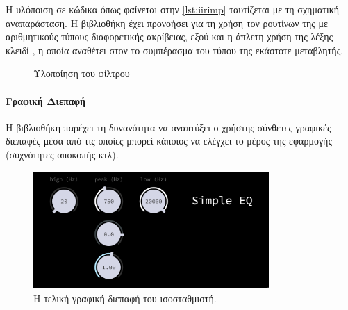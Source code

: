 \documentclass{article}
\begin{document}
Η υλόποιση σε κώδικα όπως φαίνεται στην \cref{lst:iirimp} ταυτίζεται με τη σχηματική 
αναπαράσταση. Η βιβλιοθήκη  έχει προνοήσει για τη χρήση τον ρουτίνων 
της με αριθμητικούς τύπους διαφορετικής ακρίβειας, εξού και η άπλετη χρήση της 
λέξης-κλειδί  \cite{CppReferenceAuto}, η οποία αναθέτει στον  το συμπέρασμα του τύπου 
της εκάστοτε μεταβλητής.

\vspace{5mm}

\begin{figure}
\centering
    
\caption{Υλοποίηση του  φίλτρου}
\label{fig:iir_filter_block}

\end{figure}

\begin{minipage}{\textwidth}
\end{minipage}


\paragraph{Γραφική Διεπαφή}

\epigraph{}{}

Η βιβλιοθήκη  παρέχει τη δυνανότητα να αναπτύξει ο χρήστης 
σύνθετες γραφικές διεπαφές μέσα από τις οποίες μπορεί κάποιος να ελέγχει 
το  μέρος της εφαρμογής (συχνότητες αποκοπής κτλ).

\begin{figure}[htpb]
    \centering
    \includegraphics[width=0.8\textwidth]{./assets/GUI.png}
    \caption{Η τελική γραφική διεπαφή του ισοσταθμιστή.}
    \label{fig:finalgui}
\end{figure}
\end{document}
